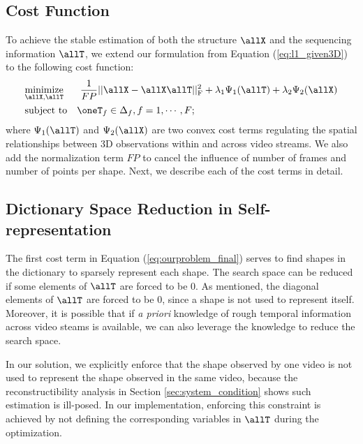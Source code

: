 \subsection{Cost Function}
To achieve the stable estimation of both the structure $\allX$ and the sequencing information $\allT$, we extend our formulation from Equation (\ref{eq:l1_given3D}) to the following cost function:
\begin{equation}
\begin{aligned}
& \underset{\allX, \allT}{\text{minimize}}&& ~ \frac{1}{FP} || \allX - \allX\allT||_\text{F}^2
 + \lambda_1\Psi_1(\allT) + \lambda_2 \Psi_2(\allX) \\
& \text{subject to} && \oneT_f \in \Delta_f, f=1,\cdots,F;
\end{aligned}
\label{eq:ourproblem_final}
\end{equation}
where $\Psi_1(\allT)$ and  $\Psi_2(\allX)$ are two convex cost terms regulating the spatial relationships between 3D observations within and across video streams. We also add the normalization term $FP$ to cancel the influence of number of frames and number of points per shape. Next, we describe each of the cost terms in detail.

\subsection{Dictionary Space Reduction in Self-representation} \label{sec:dictionary_space_reduction}
The first cost term in Equation (\ref{eq:ourproblem_final}) serves to find shapes in the dictionary to sparsely represent each shape. The search space can be reduced if some elements of $\allT$ are forced to be 0. As mentioned, the diagonal elements of $\allT$ are forced to be 0, since a shape is not used to represent itself. Moreover, it is possible that if {\em a priori} knowledge of rough temporal information across video steams is available, we can also leverage the knowledge to reduce the search space.

In our solution, we explicitly enforce that the shape observed by one video is not used to represent the shape observed in the same video, because 
the reconstructibility analysis in Section \ref{sec:system_condition} shows such estimation is ill-posed. In our implementation, enforcing this constraint is achieved by not defining the corresponding variables in $\allT$ during the optimization.

